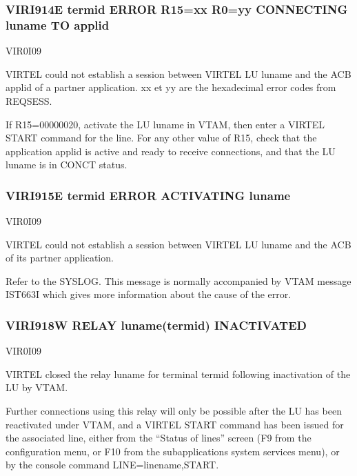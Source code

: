 \documentclass[letterpaper,10pt,english]{sphinxmanual}
\begin{document}
\subsubsection{VIRI914E termid ERROR R15=xx R0=yy CONNECTING luname TO applid}
\label{\detokenize{messages:viri914e-termid-error-r15-xx-r0-yy-connecting-luname-to-applid}}\begin{description}
\sphinxAtStartPar
VIR0I09

\sphinxAtStartPar
VIRTEL could not establish a session between VIRTEL LU luname and the ACB applid of a partner application. xx et yy are the hexadecimal error codes from REQSESS.

\sphinxAtStartPar
If R15=00000020, activate the LU luname in VTAM, then enter a VIRTEL START command for the line. For any other value of R15, check that the application applid is active and ready to receive connections, and that the LU luname is in CONCT status.

\end{description}


\subsubsection{VIRI915E termid ERROR ACTIVATING luname}
\label{\detokenize{messages:viri915e-termid-error-activating-luname}}\begin{description}
\sphinxAtStartPar
VIR0I09

\sphinxAtStartPar
VIRTEL could not establish a session between VIRTEL LU luname and the ACB of its partner application.

\sphinxAtStartPar
Refer to the SYSLOG. This message is normally accompanied by VTAM message IST663I which gives more information about the cause of the error.

\end{description}


\subsubsection{VIRI918W RELAY luname(termid) INACTIVATED}
\label{\detokenize{messages:viri918w-relay-luname-termid-inactivated}}\begin{description}
\sphinxAtStartPar
VIR0I09

\sphinxAtStartPar
VIRTEL closed the relay luname for terminal termid following inactivation of the LU by VTAM.

\sphinxAtStartPar
Further connections using this relay will only be possible after the LU has been reactivated under VTAM, and a VIRTEL START command has been issued for the associated line, either from the “Status of lines” screen (F9 from the configuration menu, or F10 from the sub\sphinxhyphen{}applications system services menu), or by the console command LINE=linename,START.

\end{description}
\end{document}
